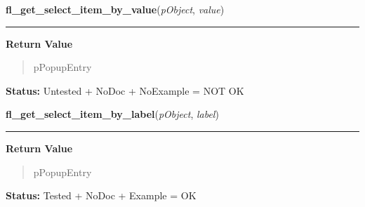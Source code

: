 \hspace{.8\funcindent}\begin{boxedminipage}{\funcwidth}

    \raggedright \textbf{fl\_get\_select\_item\_by\_value}(\textit{pObject}, \textit{value})

    \vspace{-1.5ex}

    \rule{\textwidth}{0.5\fboxrule}
\setlength{\parskip}{2ex}
\setlength{\parskip}{1ex}
      \textbf{Return Value}
    \vspace{-1ex}

      \begin{quote}
      pPopupEntry

      \end{quote}

\textbf{Status:} Untested + NoDoc + NoExample = NOT OK



    \end{boxedminipage}

    \label{xformslib:library:fl_get_select_item_by_label}

    \vspace{0.5ex}

\hspace{.8\funcindent}\begin{boxedminipage}{\funcwidth}

    \raggedright \textbf{fl\_get\_select\_item\_by\_label}(\textit{pObject}, \textit{label})

    \vspace{-1.5ex}

    \rule{\textwidth}{0.5\fboxrule}
\setlength{\parskip}{2ex}
\setlength{\parskip}{1ex}
      \textbf{Return Value}
    \vspace{-1ex}

      \begin{quote}
      pPopupEntry

      \end{quote}

\textbf{Status:} Tested + NoDoc + Example = OK



    \end{boxedminipage}

    \label{xformslib:library:fl_get_select_item_by_text}

